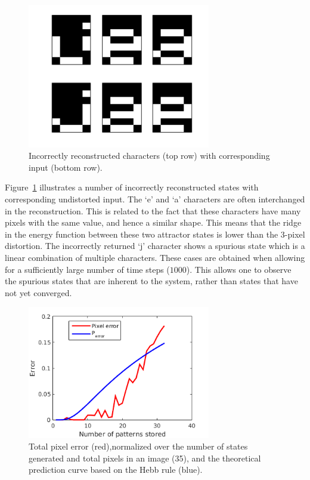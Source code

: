 \documentclass[pdftex,11pt,a4paper]{article}
\begin{document}
\begin{figure}[htb]
\centering
\includegraphics[width=8cm]{figs/wrong_states.png}
\caption{Incorrectly reconstructed characters (top row) with corresponding input (bottom row).\label{fig:wrong_states}}
\end{figure}

Figure~\ref{fig:wrong_states} illustrates a number of incorrectly reconstructed states with corresponding undistorted input. The `e' and `a' characters are often interchanged in the reconstruction. This is related to the fact that these characters have many pixels with the same value, and hence a similar shape. This means that the ridge in the energy function between these two attractor states is lower than the 3-pixel distortion. 
The incorrectly returned `j' character shows a spurious state which is a linear combination of multiple characters.
These cases are obtained when allowing for a sufficiently large number of time steps ($1000$). This allows one to observe the spurious states that are inherent to the system, rather than states that have not yet converged.

\begin{figure}[htb]
\centering
\includegraphics[width=8cm]{figs/Error_ifo_P.png}
\caption{Total pixel error (red),normalized over the number of states generated and total pixels in an image (35), and the theoretical prediction curve based on the Hebb rule (blue).\label{fig:error_ifo_P}}
\end{figure}
\end{document}
